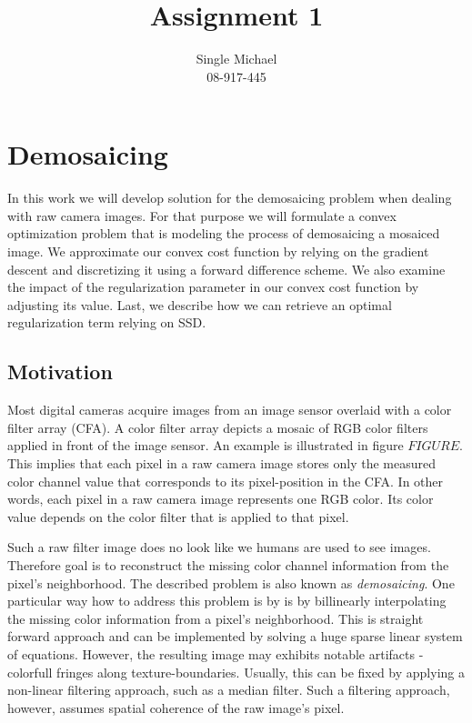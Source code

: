 \documentclass{paper}
\title{Assignment 1}
\author{Single Michael\\08-917-445}
\begin{document}
\maketitle


%

\section{Demosaicing}
In this work we will develop solution for the demosaicing problem when dealing with raw camera images. For that purpose we will formulate a convex optimization problem that is modeling the process of demosaicing a mosaiced image. We approximate our convex cost function by relying on the gradient descent and discretizing it using a forward difference scheme. We also examine the impact of the regularization parameter in our convex cost function by adjusting its value. Last, we describe how we can retrieve an optimal regularization term relying on SSD. 

\subsection{Motivation}
Most digital cameras acquire images from an image sensor overlaid with a color filter array (CFA). A color filter array depicts a mosaic of RGB color filters applied in front of the image sensor. An example is illustrated in figure $FIGURE$. This implies that each pixel in a raw camera image stores only the measured color channel value that corresponds to its pixel-position in the CFA. In other words, each pixel in a raw camera image represents one RGB color. Its color value depends on the color filter that is applied to that pixel. 

Such a raw filter image does no look like we humans are used to see images. Therefore goal is to reconstruct the missing color channel information from the pixel's neighborhood. The described problem is also known as \emph{demosaicing}. One particular way how to address this problem is by is by billinearly interpolating the missing color information from a pixel's neighborhood. This is straight forward approach and can be implemented by solving a huge sparse linear system of equations. However, the resulting image may exhibits notable artifacts - colorfull fringes along texture-boundaries. Usually, this can be fixed by applying a non-linear filtering approach, such as a median filter. Such a filtering approach, however, assumes spatial coherence of the raw image's pixel.
\end{document}
